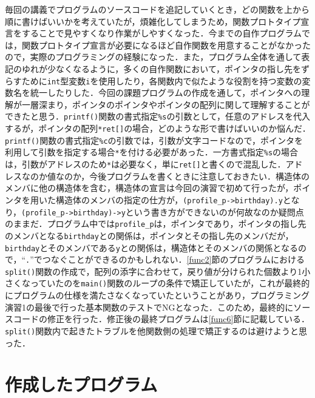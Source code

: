 毎回の講義でプログラムのソースコードを追記していくとき，どの関数を上から順に書けばいいかを考えていたが，煩雑化してしまうため，関数プロトタイプ宣言をすることで見やすくなり作業がしやすくなった\cite{book:meikai}．今までの自作プログラムでは，関数プロトタイプ宣言が必要になるほど自作関数を用意することがなかったので，実際のプログラミングの経験になった．また，プログラム全体を通して表記のゆれが少なくなるように，多くの自作関数において，ポインタの指し先をずらすために\verb|int|型変数\verb|i|を使用したり，各関数内で似たような役割を持つ変数の変数名を統一したりした．今回の課題プログラムの作成を通して，ポインタへの理解が一層深まり，ポインタのポインタやポインタの配列に関して理解することができたと思う\cite{www:label3,www:label4}．\verb|printf()|関数の書式指定\verb|%s|の引数として，任意のアドレスを代入するが，ポインタの配列\verb|*ret[]|の場合，どのような形で書けばいいのか悩んだ．\verb|printf()|関数の書式指定\verb|%c|の引数では，引数が文字コードなので，ポインタを利用して引数を指定する場合\verb|*|を付ける必要があった．一方書式指定\verb|%s|の場合は，引数がアドレスのため\verb|*|は必要なく，単に\verb|ret[]|と書くので混乱した．アドレスなのか値なのか，今後プログラムを書くときに注意しておきたい．構造体のメンバに他の構造体を含む，構造体の宣言は今回の演習で初めて行ったが，ポインタを用いた構造体のメンバの指定の仕方が，\verb|(profile_p->birthday).y|となり，\verb|(profile_p->birthday)->y|という書き方ができないのが何故なのか疑問点のままだ．プログラム中では\verb|profile_p|は，ポインタであり，ポインタの指し先のメンバとなる\verb|birthday|との関係は，ポインタとその指し先のメンバだが，\verb|birthday|とそのメンバである\verb|y|との関係は，構造体とそのメンバの関係となるので，“\verb|.|”でつなぐことができるのかもしれない．\ref{func2}節のプログラムにおける\verb|split()|関数の作成で，配列の添字に合わせて，戻り値が分けられた個数より1小さくなっていたのを\verb|main()|関数のループの条件で矯正していたが，これが最終的にプログラムの仕様を満たさなくなっていたということがあり，プログラミング演習1の最後で行った基本関数のテストでNGとなった．このため，最終的にソースコードの修正を行った．修正後の最終プログラムは\ref{func6}節に記載している．\verb|split()|関数内で起きたトラブルを他関数側の処理で矯正するのは避けようと思った．

\section{作成したプログラム}\label{sec:makep}

